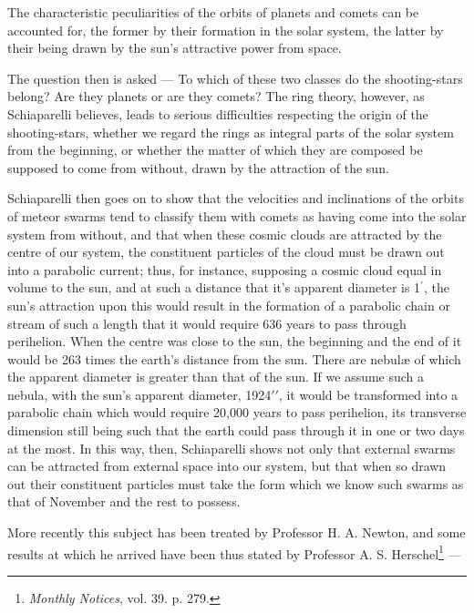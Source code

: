 \documentclass[a4paper, 12pt, oneside, polutonikogreek, english]{article}
\begin{document}
The characteristic peculiarities of the orbits of planets and comets can be accounted for, the former by their formation in the solar system, the latter by their being drawn by the sun's attractive power from space.

The question then is asked --- To which of these two classes do the shooting-stars belong? Are they planets or are they comets? The ring theory, however, as Schiaparelli believes, leads to serious difficulties respecting the origin of the shooting-stars, whether we regard the rings as integral parts of the solar system from the beginning, or whether the matter of which they are composed be supposed to come from without, drawn by the attraction of the sun.

Schiaparelli then goes on to show that the velocities and inclinations of the orbits of meteor swarms tend to classify them with comets as having come into the solar system from without, and that when these cosmic clouds are attracted by the centre of our system, the constituent particles of the cloud must be drawn out into a parabolic current; thus, for instance, supposing a cosmic cloud equal in volume to the sun, and at such a distance that it's apparent diameter is 1$^{\prime}$, the sun's attraction upon this would result in the formation of a parabolic chain or stream of such a length that it would require 636 years to pass through perihelion. When the centre was close to the sun, the beginning and the end of it would be 263 times the earth's distance from the sun. There are nebulæ of which the apparent diameter is greater than that of the sun. If we assume such a nebula, with the sun's apparent diameter, 1924$\prime\prime$, it would be transformed into a parabolic chain which would require 20,000 years to pass perihelion, its transverse dimension still being such that the earth could pass through it in one or two days at the most. In this way, then, Schiaparelli shows not only that external swarms can be attracted from external space into our system, but that when so drawn out their constituent particles must take the form which we know such swarms as that of November and the rest to possess.

More recently this subject has been treated by Professor H. A. Newton, and some results at which he arrived have been thus stated by Professor A. S. Herschel\footnote{\emph{Monthly Notices}, vol. 39. p. 279.} ---
\end{document}
